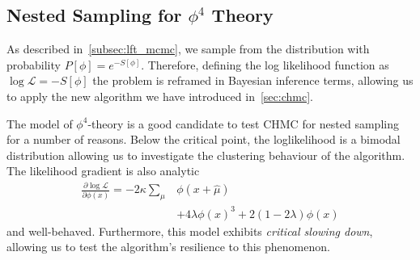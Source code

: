 \documentclass[11pt]{article}
\begin{document}
\subsection{Nested Sampling for $\phi^4$ Theory}\label{subsec:nested-sampling-phi4}
    As described in~\ref{subsec:lft_mcmc}, we sample from the distribution with probability $P[\phi] = e^{-S[\phi]}$.
    Therefore, defining the log likelihood function as $\log{\mathcal{L}} = -S[\phi]$ the problem is reframed in
    Bayesian inference terms, allowing us to apply the new algorithm we have introduced in~\ref{sec:chmc}.

    The model of $\phi^4$-theory is a good candidate to test CHMC for nested sampling for a number of reasons.
    Below the critical point, the loglikelihood is a bimodal distribution allowing us to investigate the clustering
    behaviour of the algorithm.
    The likelihood gradient is also analytic
    \begin{equation}\label{eq:grad_likelihood}
    \begin{aligned}
        \frac{\partial \log{\mathcal{L}}} {\partial \phi(x)} = -2\kappa \sum\limits_{\mu} &\phi(x+\hat{\mu}) \\
        &+ 4\lambda \phi(x)^3 + 2(1-2\lambda)\phi(x)
    \end{aligned}
    \end{equation}
    and well-behaved.
    Furthermore, this model exhibits \emph{critical slowing down}, allowing us to
    test the algorithm's resilience to this phenomenon.
\end{document}
